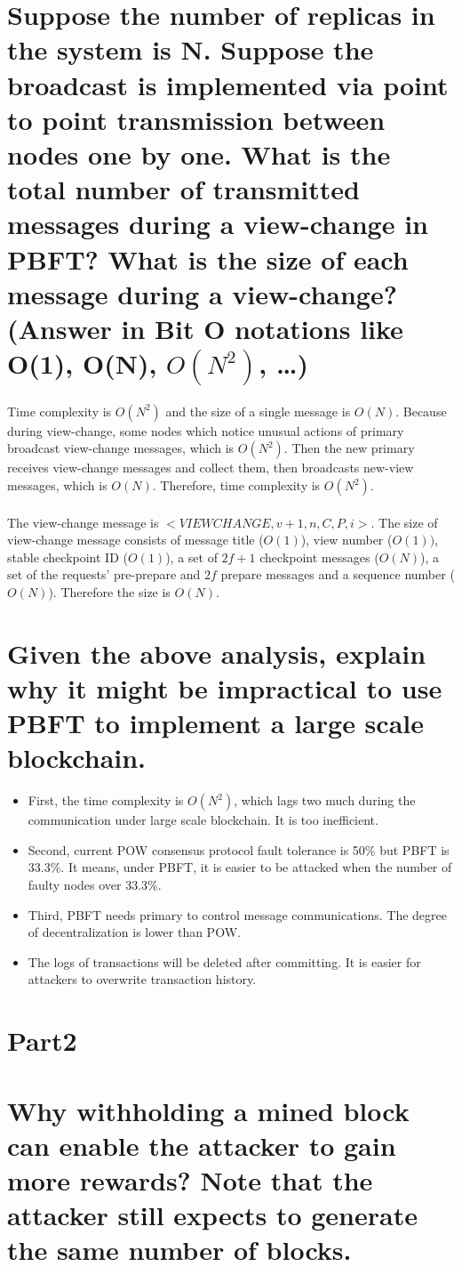 \documentclass{article}
\begin{document}
\section{Suppose the number of replicas in the system is N. Suppose the broadcast is
implemented via point to point transmission between nodes one by one. What is
the total number of transmitted messages during a view-change in PBFT? What is
the size of each message during a view-change? (Answer in Bit O notations like
O(1), O(N), $O(N^2)$, …)}
Time complexity is $O(N^2)$ and the size of a single message is $O(N)$. 
Because during view-change, 
some nodes which notice unusual actions of primary broadcast view-change messages, 
which is $O(N^2)$. Then the new primary receives view-change messages and collect them, 
then broadcasts new-view messages, which is $O(N)$. 
Therefore, time complexity is $O(N^2)$.\\\\
The view-change message is $<VIEWCHANGE, v+1, n, C, P, i>$. 
The size of view-change message consists of message title ($O(1)$), 
view number ($O(1))$, 
stable checkpoint ID ($O(1)$),
a set of $2f+1$ checkpoint messages ($O(N)$), 
a set of the requests' pre-prepare and $2f$ prepare messages and a sequence number ($O(N)$).
Therefore the size is $O(N)$.
\section{Given the above analysis, explain why it might be impractical to use PBFT to
implement a large scale blockchain.}
\begin{itemize}
    \item First, the time complexity is $O(N^2)$, 
    which lags two much during the communication under large scale blockchain. It is too inefficient.
    \item Second, current POW consensus protocol fault tolerance is 50\% but PBFT is 33.3\%. 
    It means, under PBFT, it is easier to be attacked when the number of faulty nodes over 33.3\%.
    \item Third, PBFT needs primary to control message communications. The degree of decentralization is lower than POW.
    \item The logs of transactions will be deleted after committing. It is easier for attackers to overwrite transaction history.
\end{itemize}
\section*{Part2}
\section{Why withholding a mined block can enable the attacker to gain more rewards?
Note that the attacker still expects to generate the same number of blocks.}
\end{document}

